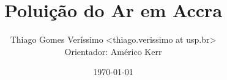 \documentclass{beamer}
\begin{document}
  \title{Poluição do Ar em Accra}
  \author{Thiago Gomes Veríssimo <thiago.verissimo at usp.br> \\
          Orientador: Américo Kerr}
  \date{\today}

\begin{frame}
  \titlepage
\end{frame}

\begin{frame}
  \tableofcontents
\end{frame}




\end{document}

